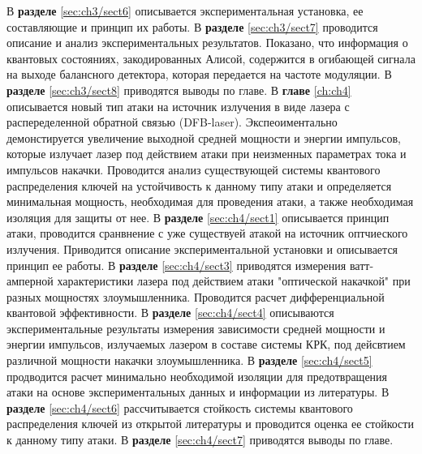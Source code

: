 \newline В \textbf{разделе} \ref{sec:ch3/sect6} описывается экспериментальная установка, ее составляющие и принцип их работы.
\newline В \textbf{разделе} \ref{sec:ch3/sect7} проводится описание и анализ экспериментальных результатов. Показано, что информация о квантовых состояниях, закодированных Алисой, содержится в огибающей сигнала на выходе балансного детектора, которая передается на частоте модуляции.
\newline В \textbf{разделе} \ref{sec:ch3/sect8} приводятся выводы по главе.
\newline В \textbf{главе} \ref{ch:ch4} описывается новый тип атаки на источник излучения в виде лазера с распеределенной обратной связью (DFB-laser). Экспеоиментально демонстируется увеличение выходной средней мощности и энергии импульсов, которые излучает лазер под действием атаки при неизменных параметрах тока и импульсов накачки. Проводится анализ существующей системы квантового распределения ключей на устойчивость к данному типу атаки и определяется минимальная мощность, необходимая для проведения атаки, а также необходимая изоляция для защиты от нее.
\newline В \textbf{разделе} \ref{sec:ch4/sect1} описывается принцип атаки, проводится сранвнение с уже существуей атакой на источник оптчиеского излучения. Приводится описание экспериментальной установки и описывается принцип ее работы.
\newline В \textbf{разделе} \ref{sec:ch4/sect3} приводятся измерения ватт-амперной характеристики лазера под действием атаки "оптической накачкой" при разных мощностях злоумышленника. Проводится расчет дифференциальной квантовой эффективности.
\newline В \textbf{разделе} \ref{sec:ch4/sect4} описываются экспериментальные результаты измерения зависимости средней мощности и энергии импульсов, излучаемых лазером в составе системы КРК, под дейсвтием различной мощности накачки злоумышленника.
\newline В \textbf{разделе} \ref{sec:ch4/sect5} продводится расчет минимально необходимой изоляции для предотвращения атаки на основе экспериментальных данных и информации из литературы.
\newline В \textbf{разделе} \ref{sec:ch4/sect6} рассчитывается стойкость системы квантового распределения ключей из открытой литературы и проводится оценка ее стойкости к данному типу атаки.
\newline В \textbf{разделе} \ref{sec:ch4/sect7} приводятся выводы по главе.
